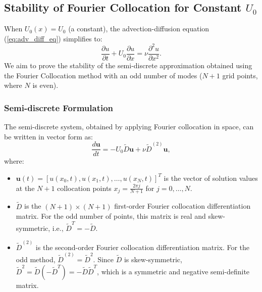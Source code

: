 \subsection{Stability of Fourier Collocation for Constant $U_0$}\label{sub:stability_constant_u0}

When $U_0(x) = U_0$ (a constant), the advection-diffusion equation (\ref{eq:adv_diff_eq}) simplifies to:
\begin{equation}
\frac{\partial u}{\partial t} + U_0 \frac{\partial u}{\partial x} = \nu \frac{\partial^2 u}{\partial x^2}.
\label{eq:adv_diff_const_U0}
\end{equation}
We aim to prove the stability of the semi-discrete approximation obtained using the Fourier Collocation method with an odd number of modes ($N+1$ grid points, where $N$ is even).

\subsubsection{Semi-discrete Formulation}
The semi-discrete system, obtained by applying Fourier collocation in space, can be written in vector form as:
\begin{equation}
\frac{d\mathbf{u}}{dt} = -U_0 \tilde{D} \mathbf{u} + \nu \tilde{D}^{(2)} \mathbf{u},
\label{eq:semidiscrete_const_U0}
\end{equation}
where:
\begin{itemize}
    \item $\mathbf{u}(t) = [u(x_0,t), u(x_1,t), \ldots, u(x_N,t)]^T$ is the vector of solution values at the $N+1$ collocation points $x_j = \frac{2\pi j}{N+1}$ for $j=0, \dots, N$.
    \item $\tilde{D}$ is the $(N+1) \times (N+1)$ first-order Fourier collocation differentiation matrix. For the odd number of points, this matrix is real and skew-symmetric, i.e., $\tilde{D}^T = -\tilde{D}$.
    \item $\tilde{D}^{(2)}$ is the second-order Fourier collocation differentiation matrix. For the odd method, $\tilde{D}^{(2)} = \tilde{D}^2$. Since $\tilde{D}$ is skew-symmetric, $\tilde{D}^2 = \tilde{D}(-\tilde{D}^T) = -\tilde{D}\tilde{D}^T$, which is a symmetric and negative semi-definite matrix.
\end{itemize}

